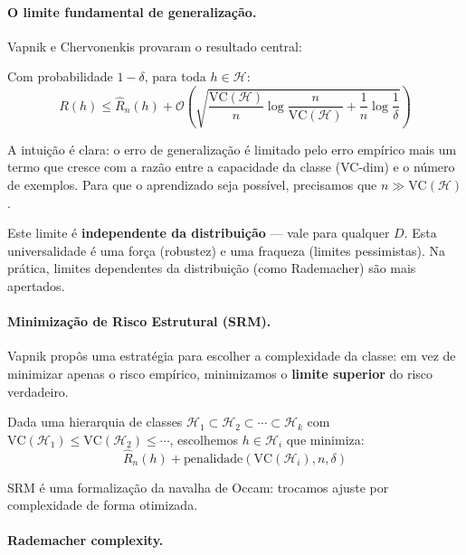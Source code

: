 \documentclass{tufte-handout}
\begin{document}
\paragraph{O limite fundamental de generalização.}

Vapnik e Chervonenkis provaram o resultado central:

\begin{thm}
    Com probabilidade $1 - \delta$, para toda $h \in \mathcal{H}$:
    \[
    R(h) \le \hat{R}_n(h) + \mathcal{O}\!\left(\sqrt{\frac{\text{VC}(\mathcal{H})}{n} \log\frac{n}{\text{VC}(\mathcal{H})} + \frac{1}{n}\log\frac{1}{\delta}}\right)
    \]
\end{thm}

A intuição é clara: o erro de generalização é limitado pelo erro empírico mais um termo que cresce com a razão entre a capacidade da classe (VC-dim) e o número de exemplos. Para que o aprendizado seja possível, precisamos que $n \gg \text{VC}(\mathcal{H})$.

\begin{remark}
    Este limite é \textbf{independente da distribuição} --- vale para qualquer $D$. Esta universalidade é uma força (robustez) e uma fraqueza (limites pessimistas). Na prática, limites dependentes da distribuição (como Rademacher) são mais apertados.
\end{remark}

\paragraph{Minimização de Risco Estrutural (SRM).}

Vapnik propôs uma estratégia para escolher a complexidade da classe: em vez de minimizar apenas o risco empírico, minimizamos o \textbf{limite superior} do risco verdadeiro.

Dada uma hierarquia de classes $\mathcal{H}_1 \subset \mathcal{H}_2 \subset \cdots \subset \mathcal{H}_k$ com $\text{VC}(\mathcal{H}_1) \le \text{VC}(\mathcal{H}_2) \le \cdots$, escolhemos $h \in \mathcal{H}_i$ que minimiza:
\[
\hat{R}_n(h) + \text{penalidade}(\text{VC}(\mathcal{H}_i), n, \delta)
\]

SRM é uma formalização da navalha de Occam: trocamos ajuste por complexidade de forma otimizada.

\paragraph{Rademacher complexity.}
\end{document}
